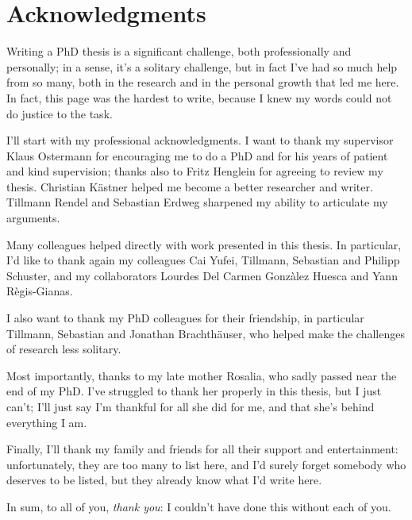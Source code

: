 
\chapter{Acknowledgments}
Writing a PhD thesis is a significant challenge, both professionally and
personally; in a sense, it's a solitary challenge, but in fact I've had so much
help from so many, both in the research and in the personal growth that led me
here. In fact, this page was the hardest to write, because I knew my words could
not do justice to the task.

I'll start with my professional acknowledgments. I want to thank my supervisor
Klaus Ostermann for encouraging me to do a PhD and for his years of patient and
kind supervision; thanks also to Fritz Henglein for agreeing to review my
thesis. Christian Kästner helped me become a better researcher and writer.
Tillmann Rendel and Sebastian Erdweg sharpened my ability to articulate my
arguments.

Many colleagues helped directly with work presented in this thesis. In
particular, I'd like to thank again my colleagues Cai Yufei, Tillmann, Sebastian
and Philipp Schuster, and my collaborators Lourdes Del Carmen Gonzàlez Huesca and
Yann Règis-Gianas.

I also want to thank my PhD colleagues for their friendship, in particular
Tillmann, Sebastian and Jonathan Brachthäuser, who helped make the challenges of
research less solitary.

Most importantly, thanks to my late mother Rosalia, who sadly passed near the end of my
PhD. I've struggled to thank her properly in this thesis, but I just can't; I'll
just say I'm thankful for all she did for me, and that she's behind everything I
am.

Finally, I'll thank my family and friends for all their support and
entertainment: unfortunately, they are too many to list here, and I'd surely
forget somebody who deserves to be listed, but they already know what I'd write
here.

In sum, to all of you, \emph{thank you}: I couldn't have done this without each
of you.



